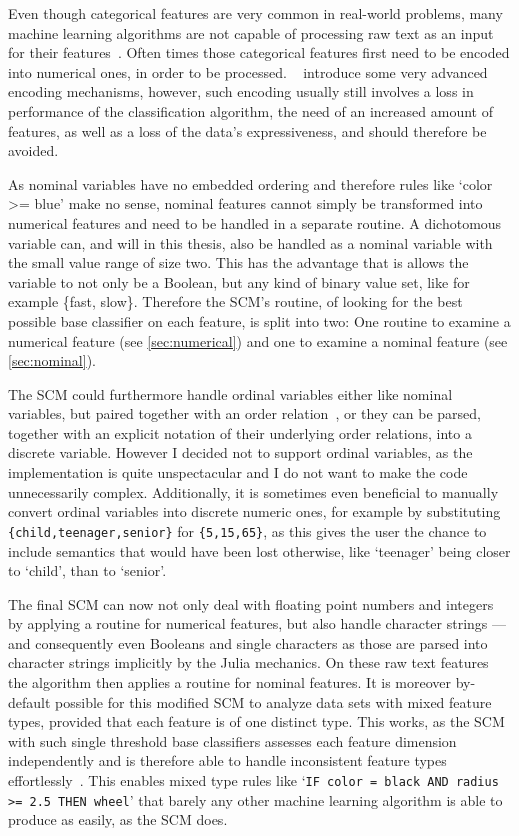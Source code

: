 Even though categorical features are very common in real-world problems, 
many machine learning algorithms are not capable of processing raw text as an input for their features~\citep{dahouda,potdar}.
Often times those categorical features first need to be encoded into numerical ones, in order to be processed.
~\cite{dahouda} introduce some very advanced encoding mechanisms, however, such encoding usually still
involves a loss in performance of the classification algorithm,
the need of an increased amount of features, as well as a loss of the data's expressiveness,
and should therefore be avoided.

As nominal variables have no embedded ordering and therefore rules like `color >= blue' make no sense,
nominal features cannot simply be transformed into numerical
features and need to be handled in a separate routine.
A dichotomous variable can, and will in this thesis, also be handled as a nominal variable with the small value range of size two.
This has the advantage that is allows the variable to not only be a Boolean, but any kind of binary
value set, like for example \{fast, slow\}.
Therefore the SCM's routine, of looking for the best possible base classifier on each feature, is split into two:
One routine to examine a numerical feature (see \autoref{sec:numerical}) and one to examine a nominal feature (see \autoref{sec:nominal}).

The SCM could furthermore handle ordinal variables either like nominal variables, but paired together with an order relation~\citep{dahouda},
or they can be parsed, together with an explicit notation of their underlying order relations, into a discrete variable.
However I decided not to support ordinal variables, as the implementation is quite
unspectacular and I do not want to make the code unnecessarily complex.
Additionally, it is sometimes even beneficial to manually convert ordinal variables into discrete numeric ones,
for example by substituting \texttt{\{child,teenager,senior\}} for \texttt{\{5,15,65\}},
as this gives the user the chance to include semantics that would have been lost otherwise,
like `teenager' being closer to `child', than to `senior'.

The final SCM can now not only deal with floating point numbers and integers by applying a routine for numerical features,
but also handle character strings --- and consequently even Booleans and single characters
as those are parsed into character strings implicitly by the Julia mechanics.
On these raw text features the algorithm then applies a routine for nominal features.
It is moreover by-default possible for this modified SCM to analyze data sets with mixed feature types,
provided that each feature is of one distinct type.
This works, as the SCM with such single threshold base classifiers assesses each feature dimension independently and is therefore
able to handle inconsistent feature types effortlessly~\citep{schmid}.
This enables mixed type rules like `\texttt{IF color = black AND radius >= 2.5 THEN wheel}' that barely any other machine learning algorithm is able
to produce as easily, as the SCM does.

